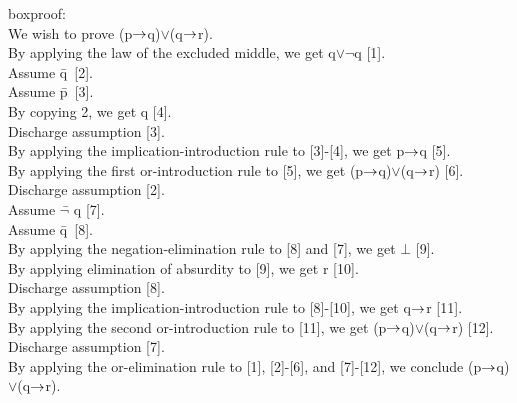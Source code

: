 \begin{tabbing}
boxproof:\\
We wish to prove (p\(\rightarrow\)q)\(\lor\)(q\(\rightarrow\)r).\\
By applying the law of the excluded middle, we get q\(\lor\)\(\neg\)q [1].\\
Assume q\=\+\ [2].\\ 
	Assume p\=\+\ [3].\\
		By copying 2, we get q [4].\\
	\< \- Discharge assumption [3].\\
	By applying the implication-introduction rule to [3]-[4], we get p\(\rightarrow\)q [5].\\
	By applying the first or-introduction rule to [5], we get (p\(\rightarrow\)q)\(\lor\)(q\(\rightarrow\)r) [6].\\
\< \- Discharge assumption [2].\\
Assume \(\neg\)\=\+ q [7].\\
	Assume q\=\+\ [8].\\
		By applying the negation-elimination rule to [8] and [7], we get \(\bot\) [9].\\
		By applying elimination of absurdity to [9], we get r [10].\\
	\< \- Discharge assumption [8].\\
	By applying the implication-introduction rule to [8]-[10], we get q\(\rightarrow\)r [11].\\
	By applying the second or-introduction rule to [11], we get (p\(\rightarrow\)q)\(\lor\)(q\(\rightarrow\)r) [12].\\
\< \- Discharge assumption [7].\\
By applying the or-elimination rule to [1], [2]-[6], and [7]-[12], we conclude (p\(\rightarrow\)q)\(\lor\)(q\(\rightarrow\)r).
\end{tabbing}
